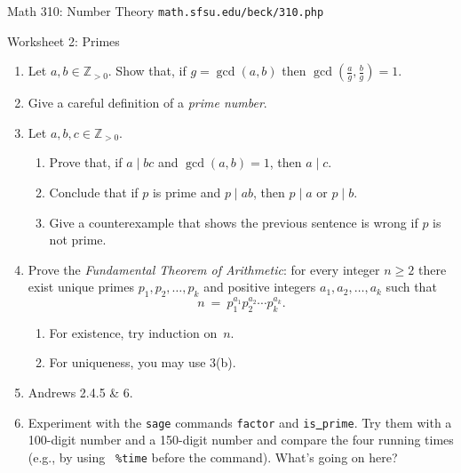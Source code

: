 \documentclass[11pt]{article}
\def\Z{\mathbb{Z}}
\def\sage{{\tt sage} }
\begin{document}
\setlength{\parindent}{0pt}
\setlength{\parskip}{0.2cm}

$\mbox{}$
\vspace{-1in}

{ Math 310: Number Theory}
\hfill
{\tt math.sfsu.edu/beck/310.php}

\vspace{.1in}

\begin{center}
\Large{Worksheet 2: Primes}
\end{center}

\begin{enumerate}

\item Let $a, b \in \Z_{ >0 }$.
Show that, if $g = \gcd(a,b)$ then $\gcd(\frac a g, \frac b g) = 1$.

\item Give a careful definition of a \emph{prime number}.

\item Let $a, b, c \in \Z_{ >0 }$.
  \begin{enumerate}
  \item Prove that, if $a \mid bc$ and $\gcd(a,b) = 1$, then $a \mid c$.
  \item Conclude that if $p$ is prime and $p \mid ab$, then $p \mid a$ or $p \mid b$.
  \item Give a counterexample that shows the previous sentence is wrong if $p$ is not prime.
  \end{enumerate}

\item Prove the \emph{Fundamental Theorem of Arithmetic}: for every integer $n \ge 2$ there exist unique primes
$p_1, p_2, \dots, p_k$ and positive integers $a_1, a_2, \dots, a_k$ such that
\[
  n \ = \ p_1^{ a_1 } p_2^{ a_2 } \cdots p_k^{ a_k } .
\]
  \begin{enumerate}
  \item For existence, try induction on~$n$.
  \item For uniqueness, you may use 3(b).
  \end{enumerate}

\item Andrews 2.4.5 \& 6.

\item Experiment with the \sage commands {\tt factor} and {\tt is\underline{ }prime}.
Try them with a 100-digit number and a 150-digit number and compare the four running times (e.g., by using {\tt
\%time} before the command). What's going on here?


\end{enumerate}
\end{document}
